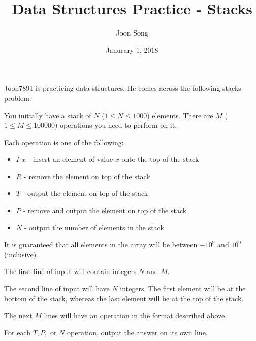 \documentclass{problem-set}
\title{Data Structures Practice - Stacks}
\date{Janurary 1, 2018}
\author{Joon Song}
\begin{document}
\maketitle

Joon7891 is practicing data structures. He comes across the following stacks problem:

You initially have a stack of $N$ ($1 \leq N \leq 1000$) elements. There are $M$ ($1 \leq M \leq 100000$) operations you need to perform on it.

Each operation is one of the following:
\begin{itemize}
    \item $I$ $x$ - insert an element of value $x$ onto the top of the stack
    \item $R$ - remove the element on top of the stack
    \item $T$ - output the element on top of the stack
    \item $P$ - remove and output the element on top of the stack
    \item $N$ - output the number of elements in the stack
\end{itemize}

It is guaranteed that all elements in the array will be between $−10^9$ and $10^9$ (inclusive).

The first line of input will contain integers $N$ and $M$.

The second line of input will have $N$ integers. The first element will be at the bottom of the stack, whereas the last element will be at the top of the stack.

The next $M$ lines will have an operation in the format described above.

\outputformat
For each $T, P,$ or $N$ operation, output the answer on its own line.
\end{document}
